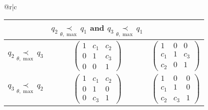 \begin{center}
\begin{tabular*}{\textwidth}{@{\extracolsep{\fill}}r|c}
\begin{tabular}{c|c|c}
      &
      $q_2 \underset{\theta,\max}{\prec} q_1$ and
      $q_3 \underset{\theta,\max}{\prec} q_1$
      \tabularnewline
      \hline
      $q_2 \underset{\theta,\max}{\prec} q_3$ &
      $\begin{pmatrix}
        1 & c_1 & c_2\\
    0 & 1 & c_3\\
    0 & 0 & 1
    \end{pmatrix}$ & 
      $\begin{pmatrix}
      1 & 0 & 0\\
    c_1 & 1 & c_3\\
    c_2 & 0 & 1
    \end{pmatrix}$\tabularnewline
    \hline
    $q_3 \underset{\theta,\max}{\prec} q_2$ &
    $\begin{pmatrix}
      1 & c_1 & c_2\\
      0 & 1 & 0\\
      0 & c_3 & 1
    \end{pmatrix}$ &
      $\begin{pmatrix}
        1 & 0 & 0\\
      c_1 & 1 & 0\\
      c_2 & c_3 & 1
    \end{pmatrix}$\tabularnewline
    \end{tabular}
  \end{tabular*}
  \TODO[correct?]
\end{center}

